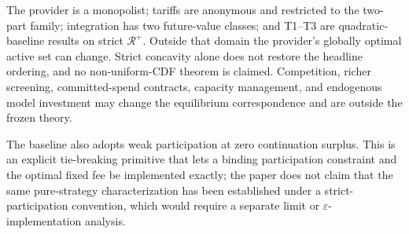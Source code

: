 The provider is a monopolist; tariffs are anonymous and restricted to the two-part family; integration has two future-value classes; and T1--T3 are quadratic-baseline results on strict $\mathcal R^+$. Outside that domain the provider's globally optimal active set can change. Strict concavity alone does not restore the headline ordering, and no non-uniform-CDF theorem is claimed. Competition, richer screening, committed-spend contracts, capacity management, and endogenous model investment may change the equilibrium correspondence and are outside the frozen theory.

The baseline also adopts weak participation at zero continuation surplus. This is an explicit tie-breaking primitive that lets a binding participation constraint and the optimal fixed fee be implemented exactly; the paper does not claim that the same pure-strategy characterization has been established under a strict-participation convention, which would require a separate limit or $\varepsilon$-implementation analysis.
